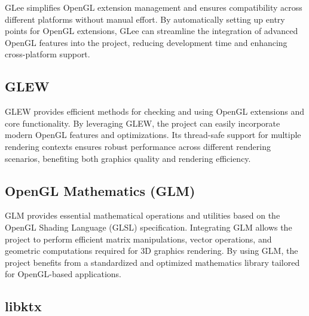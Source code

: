 GLee simplifies OpenGL extension management and ensures compatibility across different platforms without manual effort. By automatically setting up entry points for OpenGL extensions, GLee can streamline the integration of advanced OpenGL features into the project, reducing development time and enhancing cross-platform support.

\subsection*{GLEW}

GLEW provides efficient methods for checking and using OpenGL extensions and core functionality. By leveraging GLEW, the project can easily incorporate modern OpenGL features and optimizations. Its thread-safe support for multiple rendering contexts ensures robust performance across different rendering scenarios, benefiting both graphics quality and rendering efficiency.



\subsection*{OpenGL Mathematics (GLM)}

GLM provides essential mathematical operations and utilities based on the OpenGL Shading Language (GLSL) specification. Integrating GLM allows the project to perform efficient matrix manipulations, vector operations, and geometric computations required for 3D graphics rendering. By using GLM, the project benefits from a standardized and optimized mathematics library tailored for OpenGL-based applications.

\subsection*{libktx}

